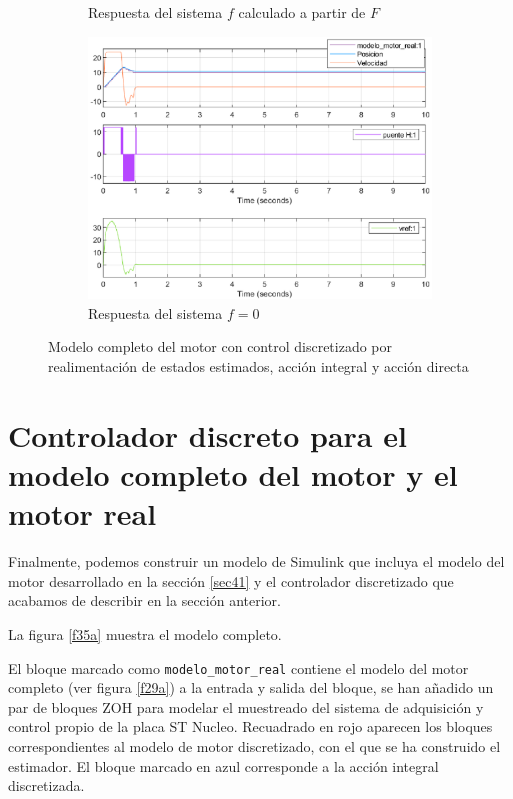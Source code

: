 \documentclass[10pt,a4paper]{report}
\begin{document}
\begin{figure}
\begin{subfigure}{0.6\textwidth}
\caption{Respuesta del sistema $f$ calculado a partir de $F$}
\label{f35b}
\end{subfigure}
\begin{subfigure}{0.6\textwidth}
\includegraphics[width=\textwidth]{motor_controlado_f0.eps}
\caption{Respuesta del sistema $f=0$}
\label{f35c}
\end{subfigure}
\caption{Modelo completo del motor con control discretizado por realimentación de estados estimados, acción integral y acción directa}
\end{figure}
\section{Controlador discreto para el modelo completo del motor y el motor real}

Finalmente, podemos construir un modelo de Simulink que incluya el modelo del motor desarrollado en la sección \ref{sec41} y el controlador discretizado que acabamos de describir en la sección anterior. 

La figura \ref{f35a} muestra el modelo completo. 

El bloque marcado como \texttt{modelo\_motor\_real} contiene el modelo del motor completo (ver figura \ref{f29a}) a la entrada y salida del bloque, se han añadido un par de bloques ZOH para modelar el muestreado del sistema de adquisición y control propio de la placa ST Nucleo. Recuadrado en rojo aparecen los bloques correspondientes al modelo de motor discretizado, con el que se ha construido el estimador. El bloque marcado en azul corresponde a la acción integral discretizada. 
\end{document}
